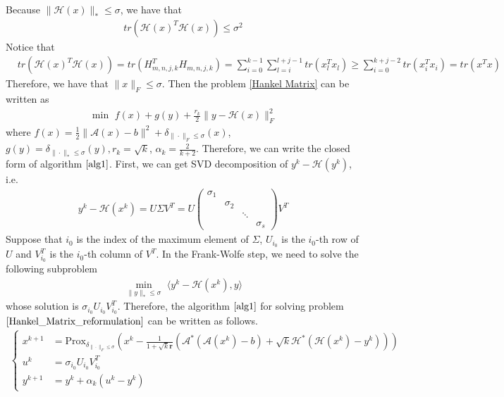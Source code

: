 \documentclass{article}
\numberwithin{equation}{section}
\begin{document}
Because $\|\mathcal{H}(x)\rVert_* \leq \sigma$, we have that
\begin{align}
    tr\left(\mathcal{H}(x)^T\mathcal{H}(x)\right) \leq \sigma^2 \nonumber
\end{align}
Notice that 
\begin{align}
    &tr\left(\mathcal{H}(x)^T\mathcal{H}(x)\right)  = 
    tr\left(H_{m,n,j,k}^T H_{m,n,j,k}\right) =\sum\limits_{i =0}^{k-1}\sum\limits_{l=i}^{l+j-1} 
    tr\left(x_l^Tx_l\right) \geq \sum\limits_{i=0}^{k+j-2} tr\left(x_i^Tx_i\right)
    = tr\left(x^Tx\right) \nonumber
\end{align}
Therefore, we have that $\|x\rVert_F \leq \sigma$.
Then the problem \eqref{Hankel Matrix} can be written as 
\begin{align}\label{Hankel_Matrix_reformulation}
    \min\hspace{4pt} f(x) + g(y) +\frac{r_k}{2}\|y-\mathcal{H}(x) \rVert_F^2 
\end{align}
where $f(x) = \frac{1}{2}\|\mathcal{A}(x)-b\rVert^2 + \delta_{\|\cdot\rVert_F \leq \sigma}(x)$, 
$g(y) = \delta_{\|\cdot\rVert_* \leq \sigma}(y), r_k = \sqrt{k}$, $\alpha_k =\frac{2}{k+2}$.
Therefore, we can write the closed form of algorithm $\ref{alg1}$.
First, we can get SVD decomposition of $y^k - \mathcal{H}(y^k)$, i.e.
\begin{align}
    y^k -\mathcal{H}(x^k) = U\Sigma V^T  = U \left(\begin{array}{cccc}
        \sigma_1 &  & & \\
          &\sigma_2 & & \\
          &   & \ddots & \\
          &   &     &\sigma_s
    \end{array}\right)  V^T \nonumber
\end{align}
Suppose that $i_0$ is the index of the maximum element of $\Sigma$, $U_{i_0}$ is the $i_0$-th row of $U$ and 
$V^T_{i_0}$ is the $i_0$-th column of $V^T$. 
In the Frank-Wolfe step, 
we need  to solve the following subproblem
\begin{align}
    \min\limits_{\|y\rVert_* \leq \sigma} \hspace{4pt} \langle y^k - \mathcal{H}(x^k), y\rangle \nonumber
\end{align}
whose solution is $\sigma_{i_0}U_{i_0}V_{i_0}^T$. Therefore, the algorithm $\ref{alg1}$ for solving 
problem $\eqref{Hankel_Matrix_reformulation}$ can be written as follows. 
\begin{align}
    \left\{
        \begin{aligned}
            x^{k+1} &= \mathrm{Prox}_{\delta_{\|\cdot\rVert_F \leq \sigma}}\left(x^k-\frac{1}{1+\sqrt{k}\mathbf{r}}\left(\mathcal{A^*}\left(\mathcal{A}(x^k)-b\right)
            +\sqrt{k}\mathcal{H^*}\left(\mathcal{H}(x^k) -y^k\right)\right)\right) \\
            u^k &= \sigma_{i_0}U_{i_0}V_{i_0}^T \\
            y^{k+1} &= y^k+ \alpha_k(u^k-y^k)
        \end{aligned}
     \right.
\end{align}
\end{document}
